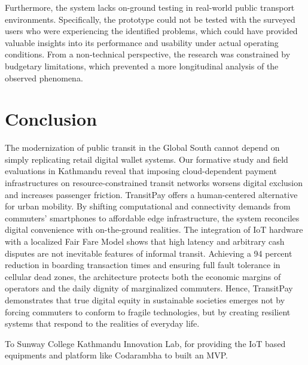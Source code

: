 \documentclass[manuscript,review,anonymous]{acmart}
\begin{document}
Furthermore, the system lacks on-ground testing in real-world public transport environments. Specifically, the prototype could not be tested with the surveyed users who were experiencing the identified problems, which could have provided valuable insights into its performance and usability under actual operating conditions. From a non-technical perspective, the research was constrained by budgetary limitations, which prevented a more longitudinal analysis of the observed phenomena.

\section{Conclusion}
The modernization of public transit in the Global South cannot depend on simply replicating retail digital wallet systems. Our formative study and field evaluations in Kathmandu reveal that imposing cloud-dependent payment infrastructures on resource-constrained transit networks worsens digital exclusion and increases passenger friction. TransitPay offers a human-centered alternative for urban mobility. By shifting computational and connectivity demands from commuters' smartphones to affordable edge infrastructure, the system reconciles digital convenience with on-the-ground realities. The integration of IoT hardware with a localized Fair Fare Model shows that high latency and arbitrary cash disputes are not inevitable features of informal transit. Achieving a 94 percent reduction in boarding transaction times and ensuring full fault tolerance in cellular dead zones, the architecture protects both the economic margins of operators and the daily dignity of marginalized commuters. Hence, TransitPay demonstrates that true digital equity in sustainable societies emerges not by forcing commuters to conform to fragile technologies, but by creating resilient systems that respond to the realities of everyday life.



\begin{acks}
To Sunway College Kathmandu Innovation Lab, for providing the IoT based equipments and platform like Codarambha to built an MVP.
\end{acks}




\appendix
\end{document}
